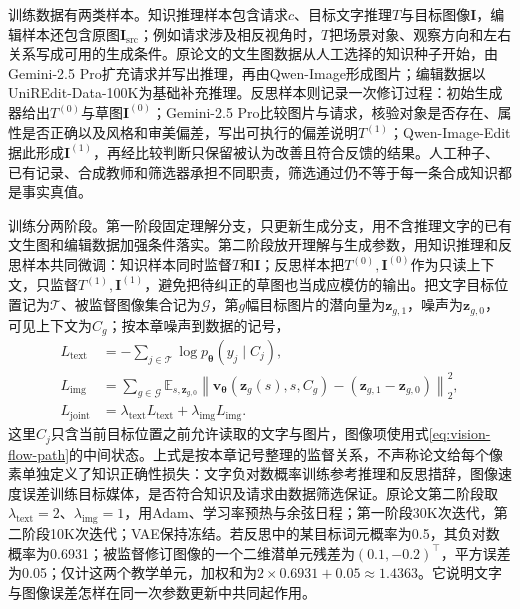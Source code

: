 训练数据有两类样本。知识推理样本包含请求$c$、目标文字推理$T$与目标图像$\bm I$，编辑样本还包含原图$\bm I_{\mathrm{src}}$；例如请求涉及相反视角时，$T$把场景对象、观察方向和左右关系写成可用的生成条件。原论文的文生图数据从人工选择的知识种子开始，由Gemini-2.5 Pro扩充请求并写出推理，再由Qwen-Image形成图片；编辑数据以UniREdit-Data-100K为基础补充推理。反思样本则记录一次修订过程：初始生成器给出$T^{(0)}$与草图$\bm I^{(0)}$；Gemini-2.5 Pro比较图片与请求，核验对象是否存在、属性是否正确以及风格和审美偏差，写出可执行的偏差说明$T^{(1)}$；Qwen-Image-Edit据此形成$\bm I^{(1)}$，再经比较判断只保留被认为改善且符合反馈的结果。人工种子、已有记录、合成教师和筛选器承担不同职责，筛选通过仍不等于每一条合成知识都是事实真值。

训练分两阶段。第一阶段固定理解分支，只更新生成分支，用不含推理文字的已有文生图和编辑数据加强条件落实。第二阶段放开理解与生成参数，用知识推理和反思样本共同微调：知识样本同时监督$T$和$\bm I$；反思样本把$T^{(0)},\bm I^{(0)}$作为只读上下文，只监督$T^{(1)},\bm I^{(1)}$，避免把待纠正的草图也当成应模仿的输出。把文字目标位置记为$\mathcal T$、被监督图像集合记为$\mathcal G$，第$g$幅目标图片的潜向量为$\bm z_{g,1}$，噪声为$\bm z_{g,0}$，可见上下文为$C_g$；按本章噪声到数据的记号，
\begin{equation}
  \begin{aligned}
    L_{\mathrm{text}}
      &=-\sum_{j\in\mathcal T}
           \log p_{\bm\theta}(y_j\mid C_j),\\
    L_{\mathrm{img}}
      &=\sum_{g\in\mathcal G}\mathbb E_{s,\bm z_{g,0}}
        \left\lVert
          \bm v_{\bm\theta}(\bm z_g(s),s,C_g)
              -(\bm z_{g,1}-\bm z_{g,0})
        \right\rVert_2^2,\\
    L_{\mathrm{joint}}
      &=\lambda_{\mathrm{text}}L_{\mathrm{text}}
         +\lambda_{\mathrm{img}}L_{\mathrm{img}}.
  \end{aligned}
  \label{eq:vision-unireason-joint-objective}
\end{equation}
这里$C_j$只含当前目标位置之前允许读取的文字与图片，图像项使用式\eqref{eq:vision-flow-path}的中间状态。上式是按本章记号整理的监督关系，不声称论文给每个像素单独定义了知识正确性损失：文字负对数概率训练参考推理和反思措辞，图像速度误差训练目标媒体，是否符合知识及请求由数据筛选保证。原论文第二阶段取$\lambda_{\mathrm{text}}=2$、$\lambda_{\mathrm{img}}=1$，用Adam、学习率预热与余弦日程；第一阶段30K次迭代，第二阶段10K次迭代；VAE保持冻结。若反思中的某目标词元概率为0.5，其负对数概率为0.6931；被监督修订图像的一个二维潜单元残差为$(0.1,-0.2)^\top$，平方误差为0.05；仅计这两个教学单元，加权和为$2\times0.6931+0.05\approx1.4363$。它说明文字与图像误差怎样在同一次参数更新中共同起作用。

